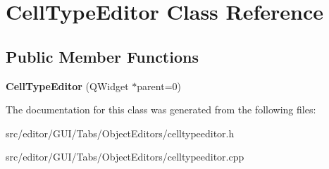 \hypertarget{class_cell_type_editor}{\section{\-Cell\-Type\-Editor \-Class \-Reference}
\label{class_cell_type_editor}
}
\subsection*{\-Public \-Member \-Functions}
\begin{DoxyCompactItemize}
\item 
\hypertarget{class_cell_type_editor_a73f1450158ae7ab6db0a030d8ea7602e}{{\bfseries \-Cell\-Type\-Editor} (\-Q\-Widget $\ast$parent=0)}\label{class_cell_type_editor_a73f1450158ae7ab6db0a030d8ea7602e}

\end{DoxyCompactItemize}


\-The documentation for this class was generated from the following files\-:\begin{DoxyCompactItemize}
\item 
src/editor/\-G\-U\-I/\-Tabs/\-Object\-Editors/celltypeeditor.\-h\item 
src/editor/\-G\-U\-I/\-Tabs/\-Object\-Editors/celltypeeditor.\-cpp\end{DoxyCompactItemize}
